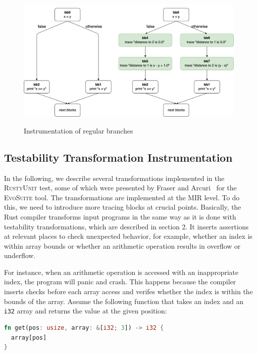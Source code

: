 \documentclass[paper=a4,%
  twoside,%
  BCOR4mm,%
  abstract=true,%
  toc=bibliography,%
  chapterprefix=true,%
  toc=bibliographynumbered,%
  open=right,%
  english,%
  pagesize=pdftex]{scrreprt}
\begin{document}
\begin{figure}[h]
\caption{Instrumentation of regular branches}
\centering
\includegraphics[width=\textwidth]{comparison-instrumented-branch-cfg}
\label{fig:comparison-instrumented-branch-cfg}
\end{figure}

\subsection{Testability Transformation Instrumentation}
\label{sec:mir-testability-transformations}
In the following, we describe several transformations implemented in the \textsc{RustyUnit} test, some of which were presented by Fraser and Arcuri~\cite{Fraser2013} for the \textsc{EvoSuite} tool. The transformations are implemented at the \ac{MIR} level. To do this, we need to introduce more tracing blocks at crucial points. Basically, the Rust compiler transforms input programs in the same way as it is done with testability transformations, which are described in section 2. It inserts assertions at relevant places to check unexpected behavior, for example, whether an index is within array bounds or whether an arithmetic operation results in overflow or underflow.

For instance, when an arithmetic operation is accessed with an inappropriate index, the program will panic and crash. This happens because the compiler inserts checks before each array access and verifes whether the index is within the bounds of the array. Assume the following function that takes an index and an \lstinline{i32} array and returns the value at the given position:
\begin{lstlisting}[language=Rust, style=boxed, caption={}, label=lst:array-index-access-example]
fn get(pos: usize, array: &[i32; 3]) -> i32 {
  array[pos]
}
\end{lstlisting}
\end{document}
